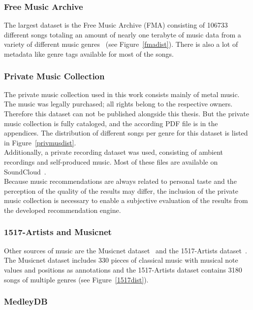 \subsubsection{Free Music Archive}

The largest dataset is the Free Music Archive (FMA) consisting of 106733 different songs totaling an amount of nearly one terabyte of music data from a variety of different music genres~\cite{fma1} (see Figure~\ref{fmadist}). There is also a lot of metadata like genre tags available for most of the songs.

\subsubsection{Private Music Collection}

The private music collection used in this work consists mainly of metal music. The music was legally purchased; all rights belong to the respective owners. Therefore this dataset can not be published alongside this thesis. But the private music collection is fully cataloged, and the according PDF file is in the appendices. The distribution of different songs per genre for this dataset is listed in Figure~\ref{privmusdist}.\\
\noindent Additionally, a private recording dataset was used, consisting of ambient recordings and self-produced music. Most of these files are available on SoundCloud~\cite{bqpd1}.\\
Because music recommendations are always related to personal taste and the perception of the quality of the results may differ, the inclusion of the private music collection is necessary to enable a subjective evaluation of the results from the developed recommendation engine.

\subsubsection{1517-Artists and Musicnet}

Other sources of music are the Musicnet dataset~\cite{musicnet1} and the 1517-Artists dataset~\cite{1517artists1}. The Musicnet dataset includes 330 pieces of classical music with musical note values and positions as annotations and the 1517-Artists dataset contains 3180 songs of multiple genres (see Figure~\ref{1517dist}). 

\subsubsection{MedleyDB}

